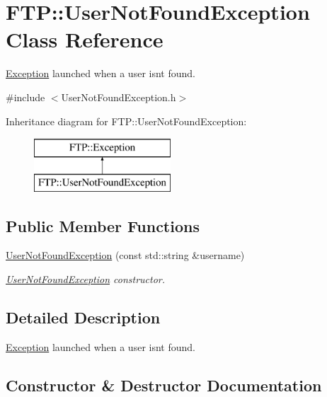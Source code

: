 \hypertarget{classFTP_1_1UserNotFoundException}{}\section{F\+T\+P\+:\+:User\+Not\+Found\+Exception Class Reference}
\label{classFTP_1_1UserNotFoundException}


\hyperlink{classFTP_1_1Exception}{Exception} launched when a user isn\textquotesingle{}t found.  




{\ttfamily \#include $<$User\+Not\+Found\+Exception.\+h$>$}

Inheritance diagram for F\+T\+P\+:\+:User\+Not\+Found\+Exception\+:\begin{figure}[H]
\begin{center}
\leavevmode
\includegraphics[height=2.000000cm]{classFTP_1_1UserNotFoundException}
\end{center}
\end{figure}
\subsection*{Public Member Functions}
\begin{DoxyCompactItemize}
\item 
\hyperlink{classFTP_1_1UserNotFoundException_af6320749bd19931a899717361fd71739}{User\+Not\+Found\+Exception} (const std\+::string \&username)
\begin{DoxyCompactList}\small\item\em \hyperlink{classFTP_1_1UserNotFoundException}{User\+Not\+Found\+Exception} constructor. \end{DoxyCompactList}\end{DoxyCompactItemize}


\subsection{Detailed Description}
\hyperlink{classFTP_1_1Exception}{Exception} launched when a user isn\textquotesingle{}t found. 

\subsection{Constructor \& Destructor Documentation}
\hypertarget{classFTP_1_1UserNotFoundException_af6320749bd19931a899717361fd71739}{}
